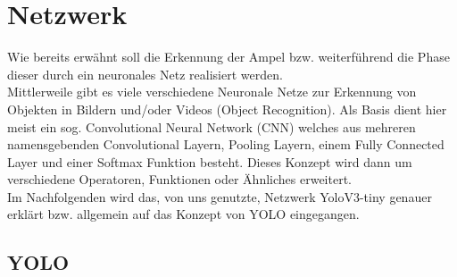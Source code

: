 \documentclass[a4paper,oneside,12pt]{report}
\begin{document}
	\chapter*{Netzwerk}
	\begin{onehalfspace}
		Wie bereits erwähnt soll die Erkennung der Ampel bzw. weiterführend die Phase dieser durch ein neuronales Netz realisiert werden.\\
		Mittlerweile gibt es viele verschiedene Neuronale Netze zur Erkennung von Objekten in Bildern und/oder Videos (Object Recognition). Als Basis dient hier meist ein sog. Convolutional Neural Network (CNN) welches aus mehreren namensgebenden Convolutional Layern, Pooling Layern, einem Fully Connected Layer und einer Softmax Funktion besteht.
		Dieses Konzept wird dann um verschiedene Operatoren, Funktionen oder Ähnliches erweitert.\\
		Im Nachfolgenden wird das, von uns genutzte, Netzwerk YoloV3-tiny genauer erklärt bzw. allgemein auf das Konzept von YOLO eingegangen.
		\section*{YOLO}

\end{onehalfspace}
\end{document}
